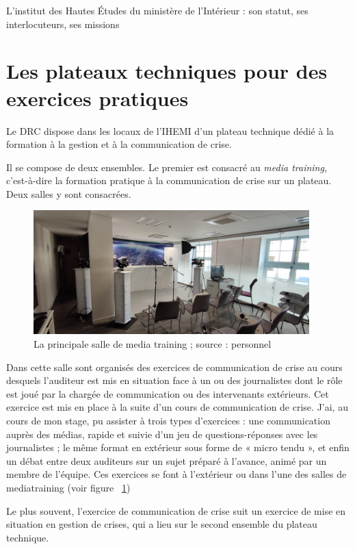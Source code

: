 \documentclass[10pt,a4paper]{report} %
\begin{document}
\begin{part}{L’institut des Hautes Études du ministère de l’Intérieur : son statut, ses interlocuteurs, ses missions}
\section{Les plateaux techniques pour des exercices pratiques}
Le DRC dispose dans les locaux de l’IHEMI d’un plateau technique dédié à la formation à la gestion et à la communication de crise.

Il se compose de deux ensembles. Le premier est consacré au \textit{media training}, c’est-à-dire la formation pratique à la communication de crise sur un plateau. Deux salles y sont consacrées.
\begin{figure}[!t]
    \centering
    \includegraphics[width=0.95\textwidth]{figures/mediatraining.jpg}
    \caption{La principale salle de media training ; source : personnel}
    \label{fig2}
\end{figure}

Dans cette salle sont organisés des exercices de communication de crise au cours desquels l’auditeur est mis en situation face à un ou des journalistes dont le rôle est joué par la chargée de communication ou des intervenants extérieurs. Cet exercice est mis en place à la suite d’un cours de communication de crise. J’ai, au cours de mon stage, pu assister à trois types d’exercices : une communication auprès des médias, rapide et suivie d’un jeu de questions-réponses avec les journalistes ; le même format en extérieur sous forme de « micro tendu », et enfin un débat entre deux auditeurs sur un sujet préparé à l’avance, animé par un membre de l’équipe. Ces exercices se font à l’extérieur ou dans l’une des salles de mediatraining (voir figure ~\ref{fig2})

Le plus souvent, l’exercice de communication de crise suit un exercice de mise en situation en gestion de crises, qui a lieu sur le second ensemble du plateau technique. 


\end{part}
\end{document}
